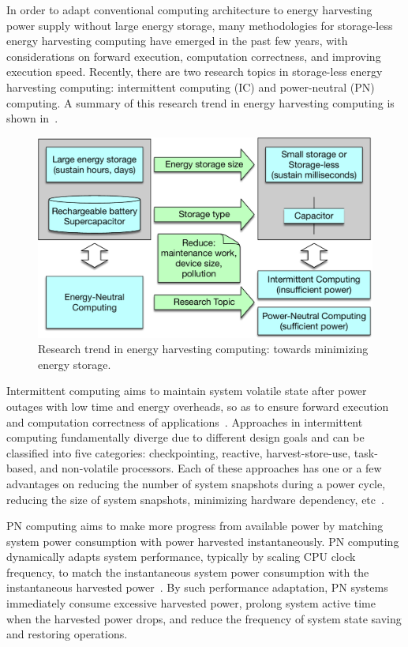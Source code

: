 In order to adapt conventional computing architecture to energy harvesting power supply without large energy storage, many methodologies for storage-less energy harvesting computing have emerged in the past few years, with considerations on forward execution, computation correctness, and improving execution speed. Recently, there are two research topics in storage-less energy harvesting computing: intermittent computing (IC) and power-neutral (PN) computing. A summary of this research trend in energy harvesting computing is shown in~.

\begin{figure}[!htb]
  \centering
  \includegraphics[width=0.7\columnwidth]{figure/intro/paradigm}
  \caption{Research trend in energy harvesting computing: towards minimizing energy storage.}
  \label{Figure:paradigm}
\end{figure}

Intermittent computing aims to maintain system volatile state after power outages with low time and energy overheads, so as to ensure forward execution and computation correctness of applications~\cite{ransford2012mementos}. Approaches in intermittent computing fundamentally diverge due to different design goals and can be classified into five categories: checkpointing, reactive, harvest-store-use, task-based, and non-volatile processors. Each of these approaches has one or a few advantages on reducing the number of system snapshots during a power cycle, reducing the size of system snapshots, minimizing hardware dependency, etc~\cite{sliper2018enabling}. 

PN computing aims to make more progress from available power by matching system power consumption with power harvested instantaneously. PN computing dynamically adapts system performance, typically by scaling CPU clock frequency, to match the instantaneous system power consumption with the instantaneous harvested power~\cite{balsamo2016graceful, fletcher2017power}. By such performance adaptation, PN systems immediately consume excessive harvested power, prolong system active time when the harvested power drops, and reduce the frequency of system state saving and restoring operations.


